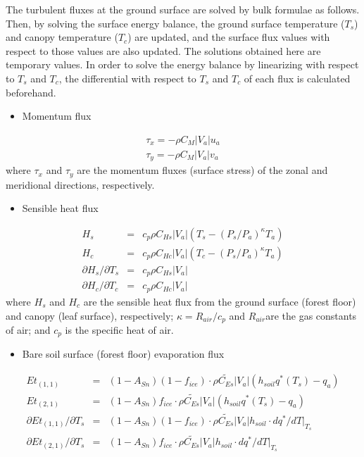 The turbulent fluxes at the ground surface are solved by bulk formulae as follows. Then, by solving the surface energy balance, the ground surface temperature (\(T_s\)) and canopy temperature
(\(T_c\)) are updated, and the surface flux values with respect to those values are also updated. The solutions obtained here are temporary values. In order to solve the energy balance by linearizing
with respect to \(T_s\) and \(T_c\), the differential with respect to \(T_s\) and \(T_c\) of each flux is calculated beforehand.

\begin{itemize}
\tightlist
\item
  Momentum flux
\end{itemize}

\begin{eqnarray}
 \tau_x = - \rho C_{M}|V_a| u_a \\
 \tau_y = - \rho C_{M}|V_a| v_a
\end{eqnarray} where \(\tau_x\) and \(\tau_y\) are the momentum fluxes (surface stress) of the zonal and meridional directions, respectively.

\begin{itemize}
\tightlist
\item
  Sensible heat flux
\end{itemize}

\begin{eqnarray}
 H_s &=& c_p \rho C_{Hs}|V_a| (T_s - (P_s/P_a)^{\kappa}T_a) \label{eq107}
  \\
 H_c &=& c_p \rho C_{Hc}|V_a| (T_c - (P_s/P_a)^{\kappa}T_a) \\
 \partial H_s/\partial T_s &=& c_p \rho C_{Hs}|V_a| \\
 \partial H_c/\partial T_c &=& c_p \rho C_{Hc}|V_a|
\end{eqnarray} where \(H_s\) and \(H_c\) are the sensible heat flux from the ground surface (forest floor) and canopy (leaf surface), respectively; \(\kappa = R_{air} / c_p\) and \(R_{air}\)are the gas constants
of air; and \(c_p\) is the specific heat of air.

\begin{itemize}
\tightlist
\item
  Bare soil surface (forest floor) evaporation flux
\end{itemize}

\begin{eqnarray}
 Et_{(1,1)} &=& (1-A_{Sn})(1-f_{ice})\cdot
           \rho \widetilde{C_{Es}}|V_a|(h_{soil}q^\ast(T_s) - q_a) \\
 Et_{(2,1)} &=& (1-A_{Sn})f_{ice}\cdot
           \rho \widetilde{C_{Es}}|V_a|(h_{soil}q^\ast(T_s) - q_a) \\
 \partial Et_{(1,1)}/\partial T_s &=& (1-A_{Sn})(1-f_{ice})\cdot
           \rho \widetilde{C_{Es}}|V_a|h_{soil}\cdot dq^\ast/dT |_{T_s} \\
 \partial Et_{(2,1)}/\partial T_s &=& (1-A_{Sn})f_{ice}\cdot
           \rho \widetilde{C_{Es}}|V_a|h_{soil}\cdot dq^\ast/dT |_{T_s}
\end{eqnarray}


